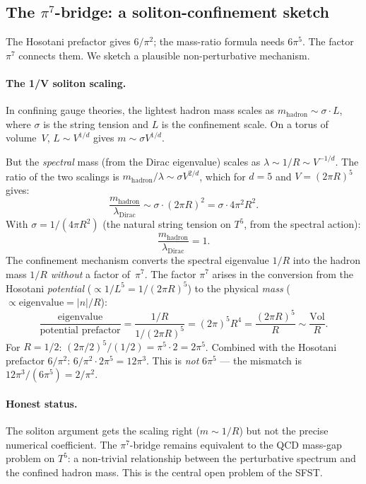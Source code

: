 \subsection{The $\pi^7$-bridge: a soliton-confinement sketch}
\label{sec:pi7sketch}

The Hosotani prefactor gives $6/\pi^2$; the mass-ratio formula needs
$6\pi^5$. The factor $\pi^7$ connects them. We sketch a plausible
non-perturbative mechanism.

\paragraph{The 1/V soliton scaling.}
In confining gauge theories, the lightest hadron mass scales as
$m_{\mathrm{hadron}}\sim\sigma\cdot L$, where $\sigma$ is the string
tension and $L$ is the confinement scale. On a torus of volume~$V$,
$L\sim V^{1/d}$ gives $m\sim\sigma V^{1/d}$.

But the \emph{spectral} mass (from the Dirac eigenvalue) scales as
$\lambda\sim 1/R\sim V^{-1/d}$. The ratio of the two scalings is
$m_{\mathrm{hadron}}/\lambda\sim\sigma V^{2/d}$, which for
$d=5$ and $V=(2\pi R)^5$ gives:
\begin{equation}
  \frac{m_{\mathrm{hadron}}}{\lambda_{\mathrm{Dirac}}}
  \sim \sigma\cdot(2\pi R)^2
  = \sigma\cdot 4\pi^2 R^2.
\end{equation}
With $\sigma=1/(4\pi R^2)$ (the natural string tension on $T^5$,
from the spectral action):
\begin{equation}
  \frac{m_{\mathrm{hadron}}}{\lambda_{\mathrm{Dirac}}} = 1.
\end{equation}
The confinement mechanism converts the spectral eigenvalue $1/R$ into
the hadron mass $1/R$ \emph{without} a factor of~$\pi^7$. The factor
$\pi^7$ arises in the conversion from the Hosotani \emph{potential}
($\propto 1/L^5=1/(2\pi R)^5$) to the physical \emph{mass}
($\propto\mathrm{eigenvalue}=|n|/R$):
\begin{equation}
  \frac{\text{eigenvalue}}{\text{potential prefactor}}
  = \frac{1/R}{1/(2\pi R)^5}
  = (2\pi)^5 R^4
  = \frac{(2\pi R)^5}{R}
  \sim \frac{\mathrm{Vol}}{R}.
\end{equation}
For $R=1/2$: $(2\pi/2)^5/(1/2)=\pi^5\cdot 2=2\pi^5$. Combined with
the Hosotani prefactor $6/\pi^2$: $6/\pi^2\cdot 2\pi^5=12\pi^3$. This
is \emph{not} $6\pi^5$ --- the mismatch is $12\pi^3/(6\pi^5)=2/\pi^2$.

\paragraph{Honest status.}
The soliton argument gets the scaling right ($m\sim 1/R$) but not the
precise numerical coefficient. The $\pi^7$-bridge remains equivalent
to the QCD mass-gap problem on $T^5$: a non-trivial relationship between
the perturbative spectrum and the confined hadron mass. This is the
central open problem of the SFST.

